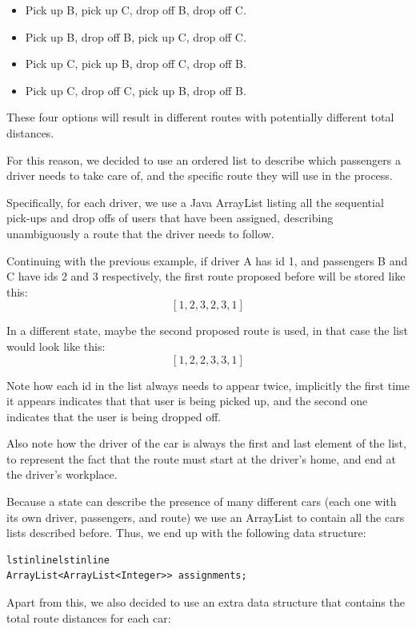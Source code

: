 \documentclass[12]{article}
\begin{document}
\begin{itemize}
	\item Pick up B, pick up C, drop off B, drop off C.
	\item Pick up B, drop off B, pick up C, drop off C.
    \item Pick up C, pick up B, drop off C, drop off B.
    \item Pick up C, drop off C, pick up B, drop off B.
\end{itemize}

These four options will result in different routes with potentially different total distances.

For this reason, we decided to use an ordered list to describe which passengers a driver needs to take care of, and the specific route they will use in the process.

Specifically, for each driver, we use a Java ArrayList listing all the sequential pick-ups and drop offs of users that have been assigned, describing unambiguously a route that the driver needs to follow.

Continuing with the previous example, if driver A has id 1, and passengers B and C have ids 2 and 3 respectively, the first route proposed before will be stored like this: $$[1, 2, 3, 2, 3, 1]$$

In a different state, maybe the second proposed route is used, in that case the list would look like this: $$[1, 2, 2, 3, 3, 1]$$

Note how each id in the list always needs to appear twice, implicitly the first time it appears indicates that that user is being picked up, and the second one indicates that the user is being dropped off.

Also note how the driver of the car is always the first and last element of the list, to represent the fact that the route must start at the driver's home, and end at the driver's workplace.

Because a state can describe the presence of many different cars (each one with its own driver, passengers, and route) we use an ArrayList to contain all the cars lists described before. Thus, we end up with the following data structure:

\begin{lstlisting}lstinlinelstinline
ArrayList<ArrayList<Integer>> assignments;
\end{lstlisting}

Apart from this, we also decided to use an extra data structure that contains the total route distances for each car:
\end{document}
